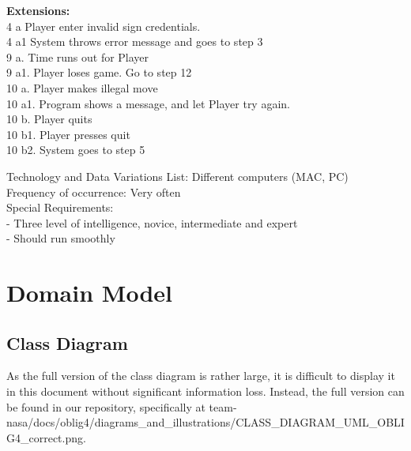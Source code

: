\documentclass{article}
\begin{document}
\begin{flushleft}
\textbf{Extensions:}\\
\hspace{5mm}	4 a Player enter invalid sign credentials.\\
\hspace{5mm}	4 a1 System throws error message and goes to step 3\\
\hspace{5mm}	9 a. Time runs out for Player\\
\hspace{5mm}	9 a1. Player loses game. Go to step 12\\
\hspace{5mm}	10 a. Player makes illegal move\\
\hspace{5mm}	10 a1. Program shows a message, and let Player try again.\\
\hspace{5mm}	10 b. Player quits\\
\hspace{5mm}	10 b1. Player presses quit\\
\hspace{5mm}	10 b2. System goes to step 5\\
\vspace{3mm}

Technology and Data Variations List:\hspace{3mm} Different computers (MAC, PC)\\
Frequency of occurrence:\hspace{3mm} Very often\\
Special Requirements:\\
\hspace{5mm} - Three level of intelligence, novice, intermediate and expert\\
\hspace{5mm} - Should run smoothly\\
\vspace{10mm}

\newpage
\section{Domain Model}
\subsection{Class Diagram}
As the full version of the class diagram is rather large, it is difficult to display it in this document without significant information loss. Instead, the full version can be found in our repository, specifically at team-nasa/docs/oblig4/diagrams\_and\_illustrations/CLASS\_DIAGRAM\_UML\_OBLIG4\_correct.png.

	
\end{flushleft}
\end{document}
